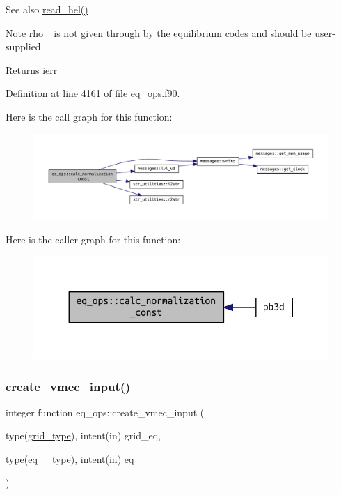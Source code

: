 \begin{DoxySeeAlso}{See also}
\hyperlink{namespacehelena__ops_ae05ba1182eb002d93c27ca4ff7ab8cf2}{read\+\_\+hel()}
\end{DoxySeeAlso}
\begin{DoxyNote}{Note}
{\ttfamily rho\+\_} is not given through by the equilibrium codes and should be user-\/supplied
\end{DoxyNote}
\begin{DoxyReturn}{Returns}
ierr 
\end{DoxyReturn}


Definition at line 4161 of file eq\+\_\+ops.\+f90.

Here is the call graph for this function\+:\nopagebreak
\begin{figure}[H]
\begin{center}
\leavevmode
\includegraphics[width=350pt]{namespaceeq__ops_a7cd38586e386e1bc684a327ebcc4c1de_cgraph}
\end{center}
\end{figure}
Here is the caller graph for this function\+:\nopagebreak
\begin{figure}[H]
\begin{center}
\leavevmode
\includegraphics[width=330pt]{namespaceeq__ops_a7cd38586e386e1bc684a327ebcc4c1de_icgraph}
\end{center}
\end{figure}
\mbox{\label{namespaceeq__ops_a9addef683b3d4a8c587510e4c994ec61}} 
\subsubsection{\texorpdfstring{create\+\_\+vmec\+\_\+input()}{create\_vmec\_input()}}
{\footnotesize\ttfamily integer function eq\+\_\+ops\+::create\+\_\+vmec\+\_\+input (\begin{DoxyParamCaption}\item[{type(\hyperlink{structgrid__vars_1_1grid__type}{grid\+\_\+type}), intent(in)}]{grid\+\_\+eq,  }\item[{type(\hyperlink{structeq__vars_1_1eq__1__type}{eq\+\_\+1\+\_\+type}), intent(in)}]{eq\+\_ }\end{DoxyParamCaption})}



